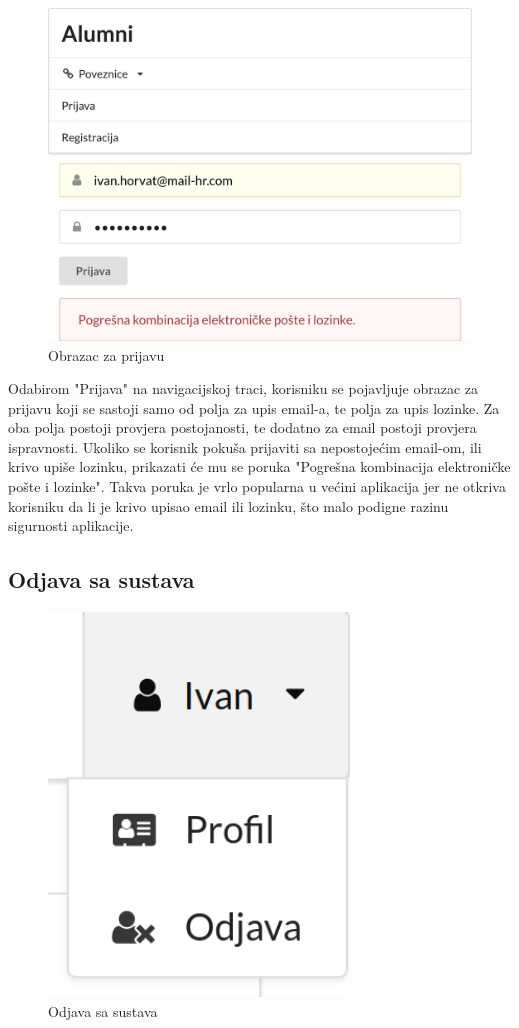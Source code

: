 \documentclass[zavrsni, numeric]{fer}
\begin{document}
\begin{figure}[H]
	\centering
	\includegraphics[width=13cm]{slike/prijava.png}
	\caption{Obrazac za prijavu}
	\label{fig:prijava}
\end{figure}

Odabirom "Prijava" na navigacijskoj traci, korisniku se pojavljuje obrazac za prijavu koji se sastoji samo od polja za upis email-a, te polja za upis lozinke. Za oba polja postoji provjera postojanosti, te dodatno za email postoji provjera ispravnosti. Ukoliko se korisnik pokuša prijaviti sa nepostojećim email-om, ili krivo upiše lozinku, prikazati će mu se poruka "Pogrešna kombinacija elektroničke pošte i lozinke". Takva poruka je vrlo popularna u većini aplikacija jer ne otkriva korisniku da li je krivo upisao email ili lozinku, što malo podigne razinu sigurnosti aplikacije.

\subsection{Odjava sa sustava}

\begin{figure}[H]
	\centering
	\includegraphics[width=8cm]{slike/odjava.png}
	\caption{Odjava sa sustava}
	\label{fig:odjava}
\end{figure}
\end{document}
